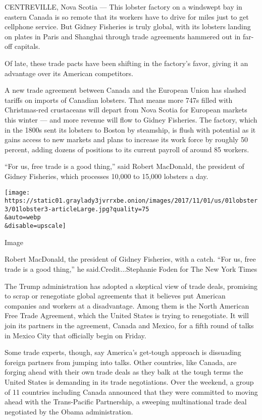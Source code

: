 CENTREVILLE, Nova Scotia --- This lobster factory on a windswept bay in
eastern Canada is so remote that its workers have to drive for miles
just to get cellphone service. But Gidney Fisheries is truly global,
with its lobsters landing on plates in Paris and Shanghai through trade
agreements hammered out in far-off capitals.

Of late, these trade pacts have been shifting in the factory's favor,
giving it an advantage over its American competitors.

A new trade agreement between Canada and the European Union has slashed
tariffs on imports of Canadian lobsters. That means more 747s filled
with Christmas-red crustaceans will depart from Nova Scotia for European
markets this winter --- and more revenue will flow to Gidney Fisheries.
The factory, which in the 1800s sent its lobsters to Boston by
steamship, is flush with potential as it gains access to new markets and
plans to increase its work force by roughly 50 percent, adding dozens of
positions to its current payroll of around 85 workers.

``For us, free trade is a good thing,'' said Robert MacDonald, the
president of Gidney Fisheries, which processes 10,000 to 15,000 lobsters
a day.

\texttt{[image: https://static01.graylady3jvrrxbe.onion/images/2017/11/01/us/01lobster3/01lobster3-articleLarge.jpg?quality=75\\\&auto=webp\\\&disable=upscale]}

Image

Robert MacDonald, the president of Gidney Fisheries, with a catch. ``For
us, free trade is a good thing,'' he said.Credit...Stephanie Foden for
The New York Times

The Trump administration has adopted a skeptical view of trade deals,
promising to scrap or renegotiate global agreements that it believes put
American companies and workers at a disadvantage. Among them is the
North American Free Trade Agreement, which the United States is trying
to renegotiate. It will join its partners in the agreement, Canada and
Mexico, for a fifth round of talks in Mexico City that officially begin
on Friday.

Some trade experts, though, say America's get-tough approach is
dissuading foreign partners from jumping into talks. Other countries,
like Canada, are forging ahead with their own trade deals as they balk
at the tough terms the United States is demanding in its trade
negotiations. Over the weekend, a group of 11 countries including Canada
announced that they were committed to moving ahead with the
Trans-Pacific Partnership, a sweeping multinational trade deal
negotiated by the Obama administration.

